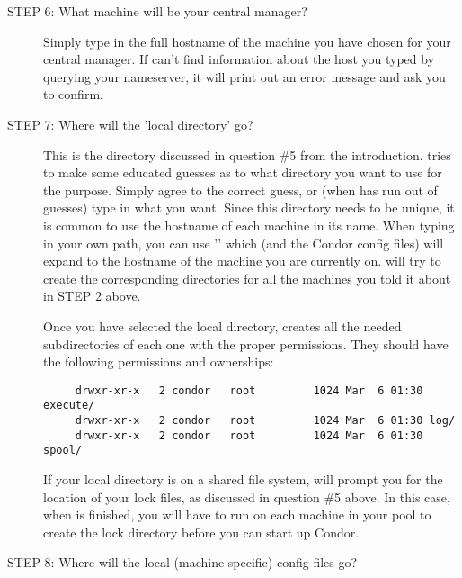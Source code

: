 \begin{description}

\item[STEP 6: What machine will be your central manager?]

     Simply type in the full hostname of the machine you have chosen
     for your central manager.  If  can't find
     information about the host you typed by querying your nameserver,
     it will print out an error message and ask you to confirm.


\item[STEP 7: Where will the 'local directory' go?]

     This is the directory discussed in question \#5 from the
     introduction.   tries to make some educated guesses
     as to what directory you want to use for the purpose.  Simply
     agree to the correct guess, or (when  has run out
     of guesses) type in what you want.  Since this directory needs to
     be unique, it is common to use the hostname of each machine in
     its name.  When typing in your own path, you can use
     '' which  (and the Condor config files)
     will expand to the hostname of the machine you are currently on.
      will try to create the corresponding directories
     for all the machines you told it about in STEP 2 above.

     Once you have selected the local directory, 
     creates all the needed subdirectories of each one with the proper
     permissions.  They should have the following permissions and
     ownerships:
\begin{verbatim}
     drwxr-xr-x   2 condor   root         1024 Mar  6 01:30 execute/
     drwxr-xr-x   2 condor   root         1024 Mar  6 01:30 log/
     drwxr-xr-x   2 condor   root         1024 Mar  6 01:30 spool/
\end{verbatim}

     If your local directory is on a shared file system,
      will prompt you for the location of your lock
     files, as discussed in question \#5 above.  In this case, when
      is finished, you will have to run  on
     each machine in your pool to create the lock directory before you
     can start up Condor.


\item[STEP 8: Where will the local (machine-specific) config files go?]


\end{description}
